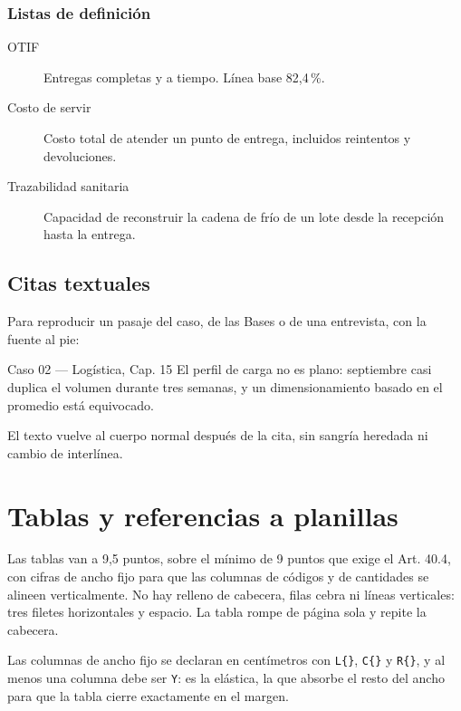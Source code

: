 \documentclass[carta,firma,borrador]{lafrox}
\begin{document}
\subsection{Listas de definición}

\begin{description}
  \item[OTIF] Entregas completas y a tiempo. Línea base 82,4\,\%.
  \item[Costo de servir] Costo total de atender un punto de entrega, incluidos
        reintentos y devoluciones.
  \item[Trazabilidad sanitaria] Capacidad de reconstruir la cadena de frío de
        un lote desde la recepción hasta la entrega.
\end{description}

\section{Citas textuales}

Para reproducir un pasaje del caso, de las Bases o de una entrevista, con la
fuente al pie:

\begin{cita}{Caso 02 --- Logística, Cap. 15}
El perfil de carga no es plano: septiembre casi duplica el volumen durante tres
semanas, y un dimensionamiento basado en el promedio está equivocado.
\end{cita}

El texto vuelve al cuerpo normal después de la cita, sin sangría heredada ni
cambio de interlínea.

\chapter{Tablas y referencias a planillas}
\label{cap:tablas}

Las tablas van a 9,5 puntos, sobre el mínimo de 9 puntos que exige el
Art. 40.4, con cifras de ancho fijo para que las columnas de códigos y de
cantidades se alineen verticalmente. No hay relleno de cabecera, filas cebra
ni líneas verticales: tres filetes horizontales y espacio. La tabla rompe de
página sola y repite la cabecera.

Las columnas de ancho fijo se declaran en centímetros con \texttt{L\{\}},
\texttt{C\{\}} y \texttt{R\{\}}, y al menos una columna debe ser \texttt{Y}:
es la elástica, la que absorbe el resto del ancho para que la tabla cierre
exactamente en el margen.
\end{document}
